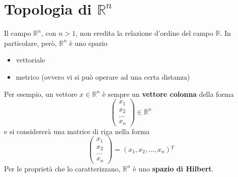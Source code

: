 \documentclass[a4paper]{extarticle}
\begin{document}
\section{Topologia di $\mathbb{R}^n$}
Il campo $\mathbb{R}^n$, con $n>1$, non eredita la relazione d'ordine del campo $\mathbb{R}$. In particolare, però, $\mathbb{R}^n$ è uno spazio
\begin{itemize}
    \item vettoriale
    \item metrico (ovvero vi si può operare ad una certa distanza)
\end{itemize}
Per esempio, un vettore $x \in \mathbb{R}^n$ è sempre un \textbf{vettore colonna} della forma
\[
    \left(
        \begin{array}{c}
            x_1\\
            x_2\\
            \dots\\
            x_n
        \end{array}
    \right)
    \in \mathbb{R}^n
\]
e si considererà una matrice di riga nella forma
\[
    \left(
        \begin{array}{c}
            x_1\\
            x_2\\
            \dots\\
            x_n
        \end{array}
    \right)
    = \left(x_1, x_2, \dots, x_n\right){^T}
\]
Per le proprietà che lo caratterizzano, $\mathbb{R}^n$ è uno \textbf{spazio di Hilbert}.

\vspace{1em}
\end{document}
